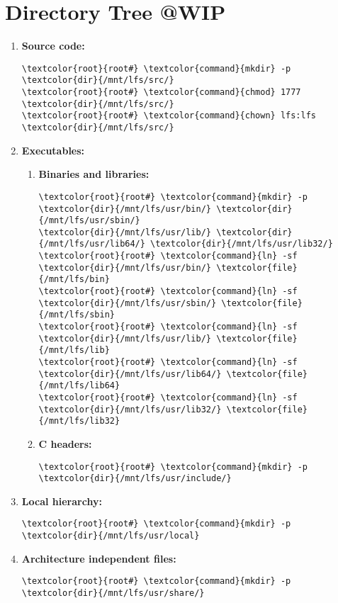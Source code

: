 \documentclass[10pt, a4paper, onecolumn, oneside, titlepage, openany]{book}
\begin{document}
\section{Directory Tree @WIP}
\begin{enumerate}
    \item \textbf{Source code:}
\begin{Verbatim}[commandchars=\\\{\}]
\textcolor{root}{root#} \textcolor{command}{mkdir} -p \textcolor{dir}{/mnt/lfs/src/}
\textcolor{root}{root#} \textcolor{command}{chmod} 1777 \textcolor{dir}{/mnt/lfs/src/}
\textcolor{root}{root#} \textcolor{command}{chown} lfs:lfs \textcolor{dir}{/mnt/lfs/src/}
\end{Verbatim}

    \item \textbf{Executables:}
    \begin{enumerate}
        \item \textbf{Binaries and libraries:}
\begin{Verbatim}[commandchars=\\\{\}]
\textcolor{root}{root#} \textcolor{command}{mkdir} -p \textcolor{dir}{/mnt/lfs/usr/bin/} \textcolor{dir}{/mnt/lfs/usr/sbin/}
\textcolor{dir}{/mnt/lfs/usr/lib/} \textcolor{dir}{/mnt/lfs/usr/lib64/} \textcolor{dir}{/mnt/lfs/usr/lib32/}
\textcolor{root}{root#} \textcolor{command}{ln} -sf \textcolor{dir}{/mnt/lfs/usr/bin/} \textcolor{file}{/mnt/lfs/bin}
\textcolor{root}{root#} \textcolor{command}{ln} -sf \textcolor{dir}{/mnt/lfs/usr/sbin/} \textcolor{file}{/mnt/lfs/sbin}
\textcolor{root}{root#} \textcolor{command}{ln} -sf \textcolor{dir}{/mnt/lfs/usr/lib/} \textcolor{file}{/mnt/lfs/lib}
\textcolor{root}{root#} \textcolor{command}{ln} -sf \textcolor{dir}{/mnt/lfs/usr/lib64/} \textcolor{file}{/mnt/lfs/lib64}
\textcolor{root}{root#} \textcolor{command}{ln} -sf \textcolor{dir}{/mnt/lfs/usr/lib32/} \textcolor{file}{/mnt/lfs/lib32}
\end{Verbatim}
    \item \textbf{C headers:}
\begin{Verbatim}[commandchars=\\\{\}]
\textcolor{root}{root#} \textcolor{command}{mkdir} -p \textcolor{dir}{/mnt/lfs/usr/include/}
\end{Verbatim}
    \end{enumerate}
    \item \textbf{Local hierarchy:}
\begin{Verbatim}[commandchars=\\\{\}]
\textcolor{root}{root#} \textcolor{command}{mkdir} -p \textcolor{dir}{/mnt/lfs/usr/local}
\end{Verbatim}
    \item \textbf{Architecture independent files:}
\begin{Verbatim}[commandchars=\\\{\}]
\textcolor{root}{root#} \textcolor{command}{mkdir} -p \textcolor{dir}{/mnt/lfs/usr/share/}
\end{Verbatim}


\end{enumerate}
\end{document}
